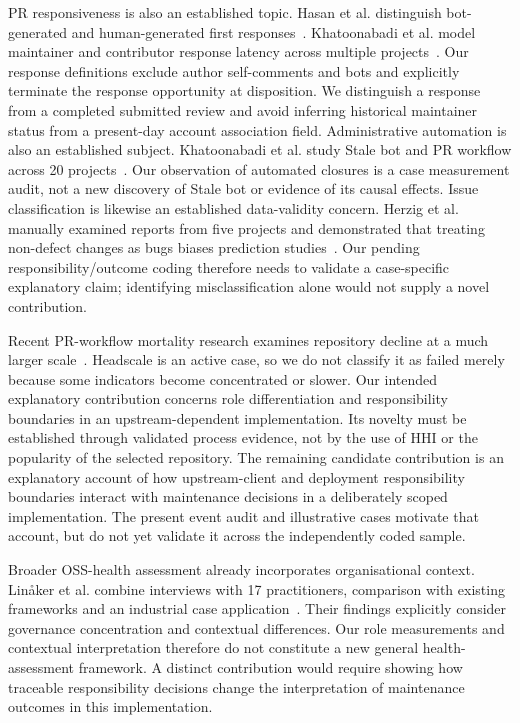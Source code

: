 \documentclass[11pt]{article}
\begin{document}
PR responsiveness is also an established topic. Hasan et al. distinguish
bot-generated and human-generated first responses~\cite{hasan2023response}.
Khatoonabadi et al. model maintainer and contributor response latency across
multiple projects~\cite{khatoonabadi2024response}. Our response definitions
exclude author self-comments and bots and explicitly terminate the response
opportunity at disposition. We distinguish a response from a completed submitted
review and avoid inferring historical maintainer status from a present-day account
association field.
Administrative automation is also an established subject. Khatoonabadi et al.
study Stale bot and PR workflow across 20 projects~\cite{khatoonabadi2023stale}.
Our observation of automated closures is a case measurement audit, not a new
discovery of Stale bot or evidence of its causal effects.
Issue classification is likewise an established data-validity concern.
Herzig et al. manually examined reports from five projects and demonstrated
that treating non-defect changes as bugs biases prediction
studies~\cite{herzig2013classification}. Our pending responsibility/outcome
coding therefore needs to validate a case-specific explanatory claim; identifying
misclassification alone would not supply a novel contribution.

Recent PR-workflow mortality research examines repository decline at a much
larger scale~\cite{kaushik2026mortality}. Headscale is an active case, so we do
not classify it as failed merely because some indicators become concentrated
or slower. Our intended explanatory contribution concerns role differentiation
and responsibility boundaries in an upstream-dependent implementation.
Its novelty must be established through validated process evidence, not by
the use of HHI or the popularity of the selected repository.
The remaining candidate contribution is an explanatory account of how
upstream-client and deployment responsibility boundaries interact with
maintenance decisions in a deliberately scoped implementation. The present
event audit and illustrative cases motivate that account, but do not yet
validate it across the independently coded sample.

Broader OSS-health assessment already incorporates organisational context.
Lin{\aa}ker et al. combine interviews with 17 practitioners, comparison with
existing frameworks and an industrial case application~\cite{linaker2026health}.
Their findings explicitly consider governance concentration and contextual
differences. Our role measurements and contextual interpretation therefore do not
constitute a new general health-assessment framework. A distinct contribution
would require showing how traceable responsibility decisions change the
interpretation of maintenance outcomes in this implementation.
\end{document}
